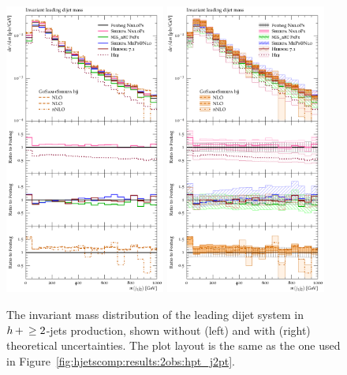 \begin{figure}[t!]
  \centering
  \includegraphics[width=0.47\textwidth]{figures/hjetscomp_u_dijet_mass.pdf}
  \hfill
  \includegraphics[width=0.47\textwidth]{figures/hjetscomp_dijet_mass.pdf}
  \caption{\label{fig:hjetscomp:results:2obs:mjj}%
    The invariant mass distribution of the leading dijet system in
    $h\!\text{~+~}\!\ge2$-jets production, shown without (left) and with (right)
    theoretical uncertainties. The plot layout is the same as the one
    used in Figure~\ref{fig:hjetscomp:results:2obs:hpt_j2pt}.}
\end{figure}

